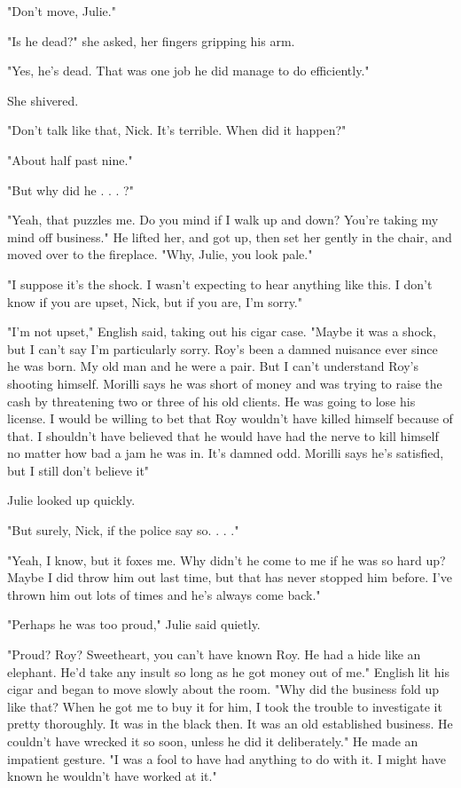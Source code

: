 \documentclass{novel}
\begin{document}
"Don't move, Julie."

"Is he dead?" she asked, her fingers gripping his arm.

"Yes, he's dead. That was one job he did manage to do efficiently."

She shivered.

"Don't talk like that, Nick. It's terrible. When did it happen?"

"About half past nine."

"But why did he . . . ?"

"Yeah, that puzzles me. Do you mind if I walk up and down? You're taking my mind off business." He lifted her, and got up, then set her gently in the chair, and moved over to the fireplace. "Why, Julie, you look pale."

"I suppose it's the shock. I wasn't expecting to hear anything like this. I don't know if you are upset, Nick, but if you are, I'm sorry."

"I'm not upset," English said, taking out his cigar case. "Maybe it was a shock, but I can't say I'm particularly sorry. Roy's been a damned nuisance ever since he was born. My old man and he were a pair. But I can't understand Roy's shooting himself. Morilli says he was short of money and was trying to raise the cash by threatening two or three of his old clients. He was going to lose his license. I would be willing to bet that Roy wouldn't have killed himself because of that. I shouldn't have believed that he would have had the nerve to kill himself no matter how bad a jam he was in. It's damned odd. Morilli says he's satisfied, but I still don't believe it"

Julie looked up quickly.

"But surely, Nick, if the police say so. . . ."

"Yeah, I know, but it foxes me. Why didn't he come to me if he was so hard up? Maybe I did throw him out last time, but that has never stopped him before. I've thrown him out lots of times and he's always come back."

"Perhaps he was too proud," Julie said quietly.

"Proud? Roy? Sweetheart, you can't have known Roy. He had a hide like an elephant. He'd take any insult so long as he got money out of me." English lit his cigar and began to move slowly about the room. "Why did the business fold up like that? When he got me to buy it for him, I took the trouble to investigate it pretty thoroughly. It was in the black then. It was an old established business. He couldn't have wrecked it so soon, unless he did it deliberately." He made an impatient gesture. "I was a fool to have had anything to do with it. I might have known he wouldn't have worked at it."
\end{document}
